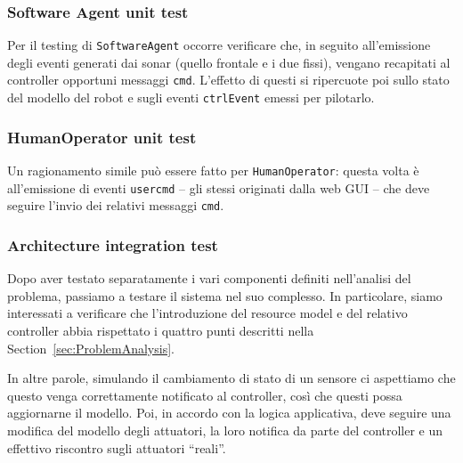 \documentclass{../llncs}
\newcommand{\codescript}[1]{{\mbox{\small{\texttt{#1}}}}\xspace}
\newcommand{\xs}[1]{\sectionname~\ref{sec:#1}}
\newcommand{\sectionname}{Section}
\begin{document}


\subsubsection{Software Agent unit test}
Per il testing di \texttt{SoftwareAgent} occorre verificare che, in seguito all'emissione degli eventi generati dai sonar (quello frontale e i due fissi), vengano recapitati al controller opportuni messaggi \codescript{cmd}. L'effetto di questi si ripercuote poi sullo stato del modello del robot e sugli eventi \codescript{ctrlEvent} emessi per pilotarlo.\\



\subsubsection{HumanOperator unit test}
Un ragionamento simile può essere fatto per \texttt{HumanOperator}: questa volta è all'emissione di eventi \codescript{usercmd} -- gli stessi originati dalla web GUI -- che deve seguire l'invio dei relativi messaggi \codescript{cmd}.\\



\subsubsection{Architecture integration test}
Dopo aver testato separatamente i vari componenti definiti nell'analisi del problema, passiamo a testare il sistema nel suo complesso. In particolare, siamo interessati a verificare che l'introduzione del resource model e del relativo controller abbia rispettato i quattro punti descritti nella \xs{ProblemAnalysis}.

In altre parole, simulando il cambiamento di stato di un sensore ci aspettiamo che questo venga correttamente notificato al controller, così che questi possa aggiornarne il modello. Poi, in accordo con la logica applicativa, deve seguire una modifica del modello degli attuatori, la loro notifica da parte del controller e un effettivo riscontro sugli attuatori ``reali''.\\
\end{document}
